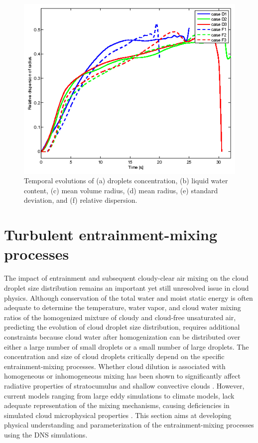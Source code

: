 \documentclass[draft,linenumbers]{AGUJournal}
\begin{document}
\begin{figure}[!htbp]
\includegraphics[width=0.48\linewidth]{Figures/dsp_radius}
\caption{Temporal evolutions of (a) droplets concentration, (b) liquid water content, (c) mean volume radius, (d) mean radius, (e) standard deviation, and (f) relative dispersion.}\label{fig:temporal_variation} 
\end{figure}

\section{Turbulent entrainment-mixing processes}\label{mixing_processes}

The impact of entrainment and subsequent cloudy-clear air mixing on the cloud droplet size distribution remains an important yet still unresolved issue in cloud physics. Although conservation of the total water and moist static energy is often adequate to determine the temperature, water vapor, and cloud water mixing ratios of the homogenized mixture of cloudy and cloud-free unsaturated air,  predicting the evolution of cloud droplet size distribution, requires additional constraints because cloud water after homogenization can be distributed over either a large number of small droplets or a small number of large droplets. The concentration and size of cloud droplets critically depend on the specific entrainment-mixing processes. Whether cloud dilution is associated with homogeneous or inhomogeneous mixing has been shown to significantly affect radiative properties of stratocumulus \citep{Chosson2007} and shallow convective clouds \citep{Grabowski2006, Slawinska2008}. However, current models ranging from large eddy simulations to climate models, lack adequate representation of the mixing mechanisms, causing deficiencies in simulated cloud microphysical properties \citep{Endo2015}. This section aims at developing physical understanding and parameterization of the entrainment-mixing processes using the DNS simulations. 
\end{document}
